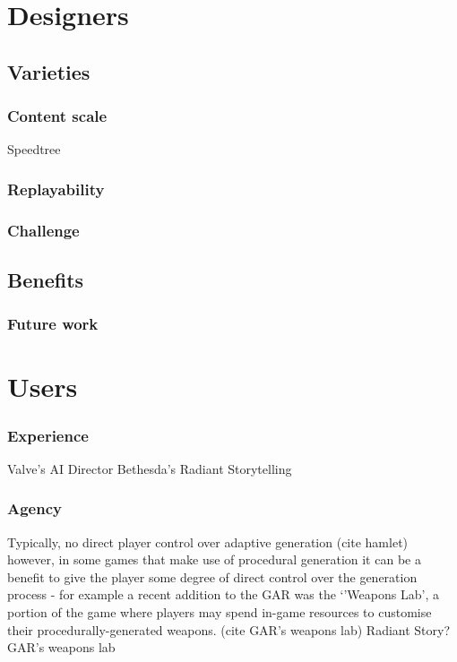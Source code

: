 \documentclass{./acm_proc_article-sp}
\begin{document}
\section{Designers}

\subsection{Varieties}
\subsubsection{Content scale}
Speedtree
\subsubsection{Replayability}
\subsubsection{Challenge}

\subsection{Benefits}
\subsubsection{Future work}

\section{Users}

\subsubsection{Experience}
Valve's AI Director
Bethesda's Radiant Storytelling
\subsubsection{Agency}
Typically, no direct player control over adaptive generation (cite hamlet)
however, in some games that make use of procedural generation it can be a benefit to give the player some degree of direct control over the generation process - for example a recent addition to the GAR was the `'Weapons Lab', a portion of the game where players may spend in-game resources to customise their procedurally-generated weapons. (cite GAR's weapons lab)
Radiant Story?
GAR's weapons lab
\end{document}
